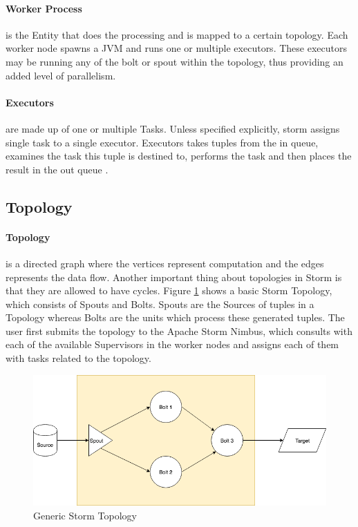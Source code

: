 \documentclass[runningheads,a4paper]{llncs}[2015/06/24]
\begin{document}
\paragraph{Worker Process} is the Entity that does the processing and is mapped to a certain topology. Each worker node spawns a JVM and runs one or multiple executors. These executors may be running any of the bolt or spout within the topology, thus providing an added level of parallelism.

\paragraph{Executors} are made up of one or multiple Tasks. Unless specified explicitly, storm assigns single task to a single executor. Executors takes tuples from the in queue, examines the task this tuple is destined to, performs the task and then places the result in the out queue \cite{stormtwitter}.

\subsection{Topology}
\paragraph{Topology} is a directed graph where the vertices represent computation and the edges represents the data flow. Another important thing about topologies in Storm is that they are allowed to have cycles. Figure \ref{fig:topo} shows a basic Storm Topology, which consists of Spouts and Bolts. Spouts are the Sources of tuples in a Topology whereas Bolts are the units which process these generated tuples. The user first submits the topology to the Apache Storm Nimbus, which consults with each of the available Supervisors in the worker nodes and assigns each of them with tasks related to the topology.

\begin{figure}
  \begin{center}
    \includegraphics[width=.7\textwidth]{topo.png}
    \caption{Generic Storm Topology}
    \label{fig:topo}
   \end{center}
\end{figure}
\end{document}
